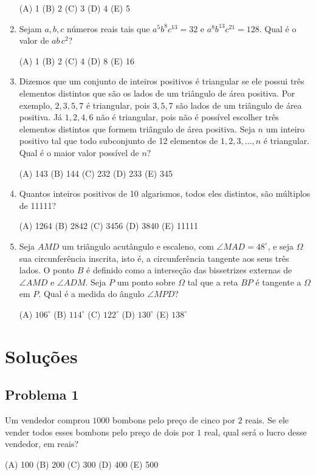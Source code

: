\documentclass[12pt]{article}
\begin{document}
\begin{enumerate}[label=\textbf{{\arabic*.}}]
(A) 1 (B) 2 (C) 3 (D) 4 (E) 5

\item Sejam $a,b,c$ números reais tais que $a^{5}b^{8}c^{13} = 32$ e $a^{8}b^{13}c^{21} = 128$. Qual é o valor de $ab\,c^{2}$?

(A) 1 (B) 2 (C) 4 (D) 8 (E) 16

\item Dizemos que um conjunto de inteiros positivos é triangular se ele possui três elementos distintos que são os lados de um triângulo de área positiva. Por exemplo, $2,3,5,7$ é triangular, pois $3,5,7$ são lados de um triângulo de área positiva. Já $1,2,4,6$ não é triangular, pois não é possível escolher três elementos distintos que formem triângulo de área positiva. Seja $n$ um inteiro positivo tal que todo subconjunto de 12 elementos de $1,2,3,\ldots,n$ é triangular. Qual é o maior valor possível de $n$?

(A) 143 (B) 144 (C) 232 (D) 233 (E) 345

\item Quantos inteiros positivos de 10 algarismos, todos eles distintos, são múltiplos de 11111?

(A) 1264 (B) 2842 (C) 3456 (D) 3840 (E) 11111

\item Seja $AMD$ um triângulo acutângulo e escaleno, com $\angle MAD = 48^\circ$, e seja $\Omega$ sua circunferência inscrita, isto é, a circunferência tangente aos seus três lados. O ponto $B$ é definido como a interseção das bissetrizes externas de $\angle AMD$ e $\angle ADM$. Seja $P$ um ponto sobre $\Omega$ tal que a reta $BP$ é tangente a $\Omega$ em $P$. Qual é a medida do ângulo $\angle MPD$?

(A) $106^\circ$ (B) $114^\circ$ (C) $122^\circ$ (D) $130^\circ$ (E) $138^\circ$

    \end{enumerate}

  \clearpage

  \section{\textsf{Soluções}}
\subsection{Problema 1}
\begin{tcolorbox}[statementbox]
      Um vendedor comprou $1000$ bombons pelo preço de cinco por $2$ reais. Se ele vender todos esses bombons pelo preço de dois por $1$ real, qual será o lucro desse vendedor, em reais?

(A) 100 (B) 200 (C) 300 (D) 400 (E) 500
\end{tcolorbox}
\clearpage
\end{document}
